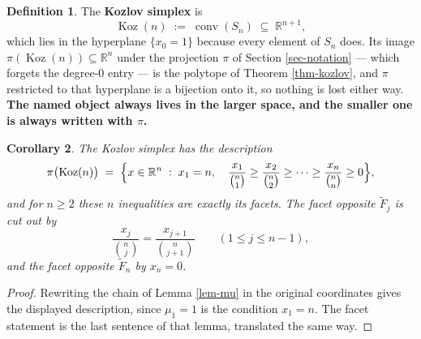 \documentclass[11pt, a4paper, abstract=yes]{scrartcl}
\theoremstyle{definition}
\newtheorem{definition}{Definition}
\theoremstyle{remark}
\theoremstyle{plain}
\newtheorem{corollary}[definition]{Corollary}
\newcommand{\Koz}{\operatorname{Koz}}
\newcommand{\proj}{\pi}
\newcommand{\conv}{\operatorname{conv}}
\begin{document}
\begin{definition}
The \textbf{Kozlov simplex} is
\begin{equation}\label{eq:kozsimplex}
  \Koz(n)\;:=\;\conv(S_n)\;\subseteq\;\mathbb R^{n+1},
\end{equation}
which lies in the hyperplane \(\lbrace x_0=1\rbrace\) because every element of \(S_n\) does. Its
image \(\proj(\Koz(n))\subseteq\mathbb R^n\) under the projection \(\proj\) of
Section \ref{sec-notation} --- which forgets the degree-\(0\) entry --- is the polytope of
Theorem \ref{thm-kozlov}, and \(\proj\) restricted to that hyperplane is a bijection onto it, so
nothing is lost either way. \textbf{\textbf{The named object always lives in the larger space, and the smaller
one is always written with \(\proj\).}}
\label{def:kozsimplex}
\label{def-kozsimplex}
\end{definition}

\begin{corollary}
The Kozlov simplex has the description
\begin{equation}\label{eq:facets}
  \proj\bigl(\Koz(n)\bigr)\;=\;\Bigl\lbrace x\in\mathbb R^{n}\;:\;x_1=n,\quad
     \frac{x_1}{\binom n1}\ge\frac{x_2}{\binom n2}\ge\cdots\ge\frac{x_n}{\binom nn}\ge0\Bigr\rbrace ,
\end{equation}
and for \(n\ge2\) these \(n\) inequalities are exactly its facets. The facet opposite \(\tilde F_j\)
is cut out by
\begin{equation}\label{eq:facets-2}
  \frac{x_j}{\binom nj}=\frac{x_{j+1}}{\binom n{j+1}}\qquad(1\le j\le n-1),
\end{equation}
and the facet opposite \(\tilde F_n\) by \(x_n=0\).
\label{cor:facets}
\label{cor-facets}
\end{corollary}

\begin{proof}
Rewriting the chain of Lemma \ref{lem-mu} in the original coordinates gives the displayed description,
since \(\mu_1=1\) is the condition \(x_1=n\). The facet statement is the last sentence of that lemma,
translated the same way.
\end{proof}
\end{document}
